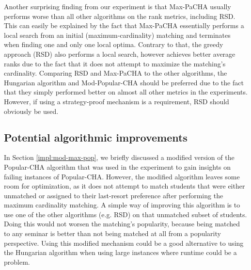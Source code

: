 Another surprising finding from our experiment is that Max-PaCHA usually performs worse than all other algorithms on the rank metrics, including RSD. This can easily be explained by the fact that Max-PaCHA essentially performs a local search from an initial (maximum-cardinality) matching and terminates when finding one and only one local optima. Contrary to that, the greedy approach (RSD) also performs a local search, however achieves better average ranks due to the fact that it does not attempt to maximize the matching's cardinality. Comparing RSD and Max-PaCHA to the other algorithms, the Hungarian algorithm and Mod-Popular-CHA should be preferred due to the fact that they simply performed better on almost all other metrics in the experiments. However, if using a strategy-proof mechanism is a requirement, RSD should obviously be used.

\subsection{Potential algorithmic improvements}\label{sec:improvements}
In Section \ref{impl:mod-max-pop}, we briefly discussed a modified version of the Popular-CHA algorithm that was used in the experiment to gain insights on failing instances of Popular-CHA. However, the modified algorithm leaves some room for optimization, as it does not attempt to match students that were either unmatched or assigned to their last-resort preference after performing the maximum cardinality matching. A simple way of improving this algorithm is to use one of the other algorithms (e.g. RSD) on that unmatched subset of students. Doing this would not worsen the matching's popularity, because being matched to any seminar is better than not being matched at all from a popularity perspective. Using this modified mechanism could be a good alternative to using the Hungarian algorithm when using large instances where runtime could be a problem. 


